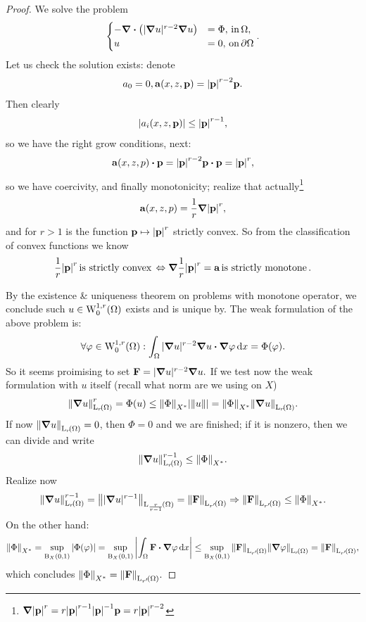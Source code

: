 \documentclass{article}
\begin{document}
\begin{proof}
	We solve the problem
	\begin{equation}
		\begin{cases}
			- \divergence{\qty(|\grad u|^{r-2}\grad u)} &= \Phi,  \, \text{in} \, \Omega, \\
			u &= 0,  \, \text{on} \, \partial \Omega
		\end{cases}.
	\end{equation}
	Let us check the solution exists: denote
	\[
		a_0 =0, \vb{a}\qty(x,z,\vb{p}) = \abs{\vb{p}}^{r-2}\vb{p}.
	\]
	Then clearly
	\[
		\abs{a_i\qty(x, z, \vb{p})} \leq \abs{\vb{p}}^{r-1},
	\]
	so we have the right grow conditions, next:
	\[
		\vb{a}\qty(x,z,p) \vdot \vb{p} = \abs{\vb{p}}^{r-2} \vb{p} \vdot \vb{p} = \abs{\vb{p}}^r,
	\]
	so we have coercivity, and finally monotonicity; realize that actually\footnote{$\grad \abs{\vb{p}}^r = r \abs{\vb{p}}^{r-1} \abs{\vb{p}}^{-1} \vb{p} = r \abs{\vb{p}}^{r-2}$}
	\[
		\vb{a}(x,z,p) = \frac{1}{r} \grad \abs{\vb{p}}^r,
	\]
and for $r>1$ is the function $\vb{p} \mapsto \abs{\vb{p}}^r$ strictly convex. So from the classification of convex functions we know
\[
	\frac{1}{r}\abs{\vb{p}}^r \, \text{is strictly convex} \, \Leftrightarrow \grad \frac{1}{r} \abs{\vb{p}}^r = \vb{a} \, \text{is strictly monotone} \,.
\]

By the existence \& uniqueness theorem on problems with monotone operator, we conclude such $u \in \WkpzeroSet[1][r]{\Omega}$ exists and is unique by. The weak formulation of the above problem is:
	\[
		\forall \varphi \in \WkpzeroSet[1][r]{\Omega}: \int_{\Omega}|\grad u|^{r-2} \grad u \vdot \grad \varphi \dd{x} = \Phi\qty(\varphi).
	\]
	So it seems proimising to set $\vb{F} = |\grad u|^{r-2} \grad u.$ If we test now the weak formulation with $u$ itself (recall what norm are we using on $X$)
	\[
		\norm{\grad u}_{\LpSet[r]{\Omega}}^r = \Phi(u) \leq \norm{\Phi}_{X^{*}} \abs{\norm{u}} = \norm{\Phi}_{X^{*}} \norm{\grad u}_{\LpSet[r]{\Omega}}.
	\]
	If now $\norm{\grad u}_{\LpSet[r]{\Omega}} = 0$, then $\Phi = 0$ and we are finished; if it is nonzero, then we can divide and write
	\[
		\norm{\grad u}_{\LpSet[r]{\Omega}}^{r-1} \leq \norm{\Phi}_{X^{*}}.
	\]
	Realize now
	\[
		\norm{\grad u}_{\LpSet[r]{\Omega}}^{r-1} = \norm{| \grad u|^{r-1}}_{\LpSet[\frac{r}{r-1}]{\Omega}} = \norm{\vb{F}}_{\LpSet[r']{\Omega}} \Rightarrow \norm{\vb{F}}_{\LpSet[r']{\Omega}} \leq \norm{\Phi}_{X^{*}}.
	\]
	On the other hand:
	\[
		\norm{\Phi}_{X^{*}} = \sup_{\text{B}_{X}(0,1)} \abs{\Phi(\varphi)} = \sup_{\text{B}_{X}(0,1)} \abs{\int_{\Omega}\vb{F} \vdot \grad \varphi \dd{x}} \leq \sup_{\text{B}_{X}(0,1)} \norm{\vb{F}}_{\LpSet[r']{\Omega}} \norm{\grad \varphi}_{\LpSet[r]{\Omega}} = \norm{\vb{F}}_{\LpSet[r']{\Omega}},
	\]
	which concludes $\norm{\Phi}_{X^{*}} = \norm{\vb{F}}_{\LpSet[r']{\Omega}}.$
\end{proof}
\end{document}
